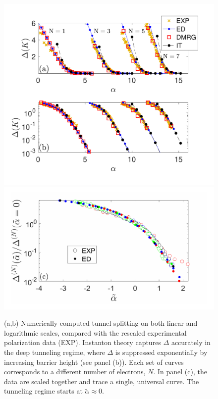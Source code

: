 \documentclass[aps, prb, floatfix, twocolumn, notitlepage, superscriptaddress, 10pt]{revtex4-2}
\newcommand{\1}{{1\hspace*{-0.5ex} \textrm{l} \hspace*{0.5ex}}}
\begin{document}

\begin{figure}[t!]
    \begin{center}
    		\includegraphics[width=0.95\columnwidth]{Fig_spectral_gap_exp_fitted_2.pdf}
     		\includegraphics[width=0.95\columnwidth]{Fig_spectral_gap_exp_log_lin_shahal_scaling_log_v2.pdf}
\caption{(a,b)  Numerically computed tunnel splitting on both linear  and logarithmic scales, compared 
with the rescaled experimental polarization data  (EXP).  Instanton theory captures  $\Delta$  accurately 
in the deep tunneling regime, where $\Delta$ is  suppressed exponentially by increasing barrier height (see  panel (b)).
 Each set of curves corresponds to a different number of electrons, $N$. 
 In panel (c), the data are scaled together and trace a single,   universal curve. 
 The tunneling regime starts at $\tilde\alpha\approx 0$.}    
     \label{fig:EXP_DMRG_ED_IT}
    \end{center}
\end{figure}    
\end{document}
